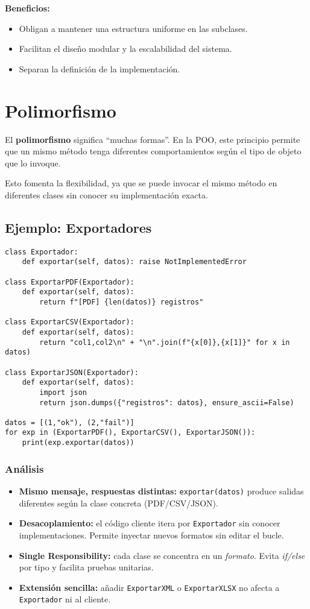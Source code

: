 \documentclass[12pt,a4paper]{article}
\begin{document}
\textbf{Beneficios:}
\begin{itemize}
    \item Obligan a mantener una estructura uniforme en las subclases.
    \item Facilitan el diseño modular y la escalabilidad del sistema.
    \item Separan la definición de la implementación.
\end{itemize}

\FloatBarrier

\section{Polimorfismo}
El \textbf{polimorfismo} significa “muchas formas”.  
En la POO, este principio permite que un mismo método tenga diferentes comportamientos según el tipo de objeto que lo invoque.

Esto fomenta la flexibilidad, ya que se puede invocar el mismo método en diferentes clases sin conocer su implementación exacta.

\subsection*{Ejemplo: Exportadores}
\begin{lstlisting}
class Exportador:
    def exportar(self, datos): raise NotImplementedError

class ExportarPDF(Exportador):
    def exportar(self, datos):
        return f"[PDF] {len(datos)} registros"

class ExportarCSV(Exportador):
    def exportar(self, datos):
        return "col1,col2\n" + "\n".join(f"{x[0]},{x[1]}" for x in datos)

class ExportarJSON(Exportador):
    def exportar(self, datos):
        import json
        return json.dumps({"registros": datos}, ensure_ascii=False)

datos = [(1,"ok"), (2,"fail")]
for exp in (ExportarPDF(), ExportarCSV(), ExportarJSON()):
    print(exp.exportar(datos))
\end{lstlisting}


\subsubsection*{Análisis}
\begin{itemize}
    \item \textbf{Mismo mensaje, respuestas distintas:} \texttt{exportar(datos)} produce salidas diferentes según la clase concreta (PDF/CSV/JSON).
    \item \textbf{Desacoplamiento:} el código cliente itera por \texttt{Exportador} sin conocer implementaciones. Permite inyectar nuevos formatos sin editar el bucle.
    \item \textbf{Single Responsibility:} cada clase se concentra en un \emph{formato}. Evita \emph{if/else} por tipo y facilita pruebas unitarias.
    \item \textbf{Extensión sencilla:} añadir \texttt{ExportarXML} o \texttt{ExportarXLSX} no afecta a \texttt{Exportador} ni al cliente.
\end{itemize}
\end{document}
